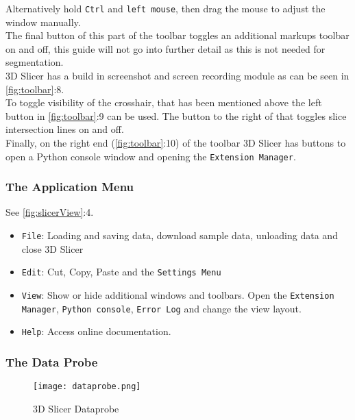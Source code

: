 Alternatively hold \texttt{Ctrl} and \texttt{left mouse}, then drag the mouse to adjust the window manually.\\
The final button of this part of the toolbar toggles an additional markups toolbar on and off, this guide will not go into further detail as this is not needed for segmentation.\\
3D Slicer has a build in screenshot and screen recording module as can be seen in \cref{fig:toolbar}:8.\\
To toggle visibility of the crosshair, that has been mentioned above the left button in \cref{fig:toolbar}:9 can be used. The button to the right of that toggles slice intersection lines on and off.\\
Finally, on the right end (\cref{fig:toolbar}:10) of the toolbar 3D Slicer has buttons to open a Python console window and opening the \texttt{Extension Manager}.

\subsubsection{The Application Menu}
See \cref{fig:slicerView}:4.
\begin{itemize}
	\item \texttt{File}: Loading and saving data, download sample data, unloading data and close 3D Slicer
	\item \texttt{Edit}: Cut, Copy, Paste and the \texttt{Settings Menu}
	\item \texttt{View}: Show or hide additional windows and toolbars. Open the \texttt{Extension Manager}, \texttt{Python console}, \texttt{Error Log} and change the view layout.
	\item \texttt{Help}: Access online documentation.
\end{itemize}

\subsubsection{The Data Probe}
\begin{figure}[h!] %
	\centerline{ %
		\texttt{[image: dataprobe.png]}}
	\caption{3D Slicer Dataprobe}\label{fig:dataprobe}
\end{figure}

